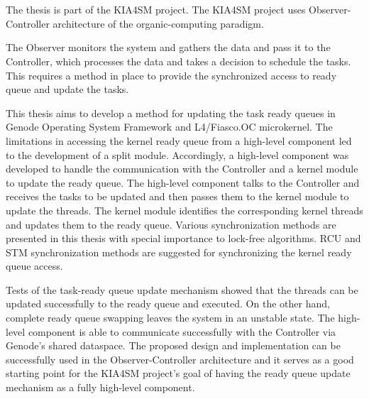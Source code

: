 \chapter{\abstractname}



The thesis is part of the KIA4SM project.  The KIA4SM project uses Observer-Controller architecture of the organic-computing paradigm. 

The Observer monitors the system and gathers the data and pass it to the Controller, which processes the data and takes a decision to schedule the tasks. This requires a method in place to provide the synchronized access to ready queue and update the tasks.


This thesis aims to develop a method for updating the task ready queues in Genode Operating System Framework and L4/Fiasco.OC microkernel. The limitations in accessing the kernel ready queue from a high-level component led to the development of a split module. Accordingly, a high-level component was developed to handle the communication with the Controller and a kernel module to update the ready queue. The high-level component talks to the Controller and receives the tasks to be updated and then passes them to the kernel module to update the threads. The kernel module identifies the corresponding kernel threads and updates them to the ready queue. Various synchronization methods are presented in this thesis with special importance to lock-free algorithms. RCU and STM synchronization methods are suggested for synchronizing the kernel ready queue access. 

Tests of the task-ready queue update mechanism showed that the threads can be updated successfully to the ready queue and executed. On the other hand, complete ready queue swapping leaves the system in an unstable state. The high-level component is able to communicate successfully with the Controller via Genode's shared dataspace. The proposed design and implementation can be successfully used in the Observer-Controller architecture and it serves as a good starting point for the KIA4SM project's goal of having the ready queue update mechanism as a fully high-level component.

